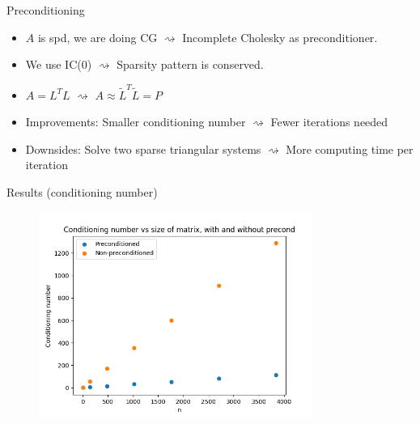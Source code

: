 \documentclass[11pt,aspectratio=1610]{beamer}
\begin{document}
\begin{frame}
\end{frame}


\begin{frame}{Preconditioning}
\begin{itemize}
    \item $A$ is spd, we are doing CG $\rightsquigarrow$ Incomplete Cholesky as preconditioner.
    \item We use IC(0) $\rightsquigarrow$ Sparsity pattern is conserved.
    \item $A = L^TL$ $\rightsquigarrow$ $A \approx \tilde{L}^T\tilde{L} = P$
    \item Improvements: Smaller conditioning number $\rightsquigarrow$ Fewer iterations needed
    \item Downsides: Solve two sparse triangular systems $\rightsquigarrow$ More computing time per iteration
\end{itemize}



\end{frame}



\begin{frame}{Results (conditioning number)}
	\begin{figure}
		\includegraphics[width=0.8\textwidth]{../images/conditioning_test.png}
	\end{figure}

\end{frame} 
\end{document}
